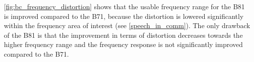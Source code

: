 



\autoref{fig:bc_frequency_distortion} shows that the usable frequency range for the B81 is improved compared to the B71, because the distortion is lowered significantly within the frequency area of interest (see \autoref{speech_in_comm}). The only drawback of the B81 is that the improvement in terms of distortion decreases towards the higher frequency range and the frequency response is not significantly improved compared to the B71. 










